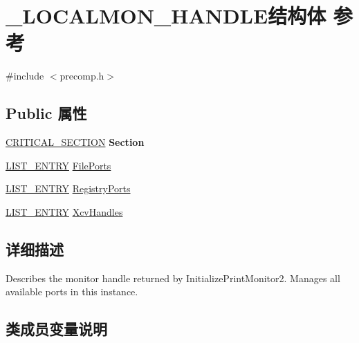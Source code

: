 \hypertarget{struct___l_o_c_a_l_m_o_n___h_a_n_d_l_e}{}\section{\+\_\+\+L\+O\+C\+A\+L\+M\+O\+N\+\_\+\+H\+A\+N\+D\+L\+E结构体 参考}
\label{struct___l_o_c_a_l_m_o_n___h_a_n_d_l_e}


{\ttfamily \#include $<$precomp.\+h$>$}

\subsection*{Public 属性}
\begin{DoxyCompactItemize}
\item 
\mbox{\label{struct___l_o_c_a_l_m_o_n___h_a_n_d_l_e_a5de1e8f4e74c1b8f5a401f92d1c0c46d}} 
\hyperlink{struct___c_r_i_t_i_c_a_l___s_e_c_t_i_o_n}{C\+R\+I\+T\+I\+C\+A\+L\+\_\+\+S\+E\+C\+T\+I\+ON} {\bfseries Section}
\item 
\hyperlink{struct___l_i_s_t___e_n_t_r_y}{L\+I\+S\+T\+\_\+\+E\+N\+T\+RY} \hyperlink{struct___l_o_c_a_l_m_o_n___h_a_n_d_l_e_aae7b0b30c912f1bf7dedf82a86d8683e}{File\+Ports}
\item 
\hyperlink{struct___l_i_s_t___e_n_t_r_y}{L\+I\+S\+T\+\_\+\+E\+N\+T\+RY} \hyperlink{struct___l_o_c_a_l_m_o_n___h_a_n_d_l_e_ac370a8e8cffe08f0a45a2a78cbdd1fbb}{Registry\+Ports}
\item 
\hyperlink{struct___l_i_s_t___e_n_t_r_y}{L\+I\+S\+T\+\_\+\+E\+N\+T\+RY} \hyperlink{struct___l_o_c_a_l_m_o_n___h_a_n_d_l_e_a50daf3d5878ddecb7e9b7d0e3e83724b}{Xcv\+Handles}
\end{DoxyCompactItemize}


\subsection{详细描述}
Describes the monitor handle returned by Initialize\+Print\+Monitor2. Manages all available ports in this instance. 

\subsection{类成员变量说明}
\mbox{\label{struct___l_o_c_a_l_m_o_n___h_a_n_d_l_e_aae7b0b30c912f1bf7dedf82a86d8683e}} 
